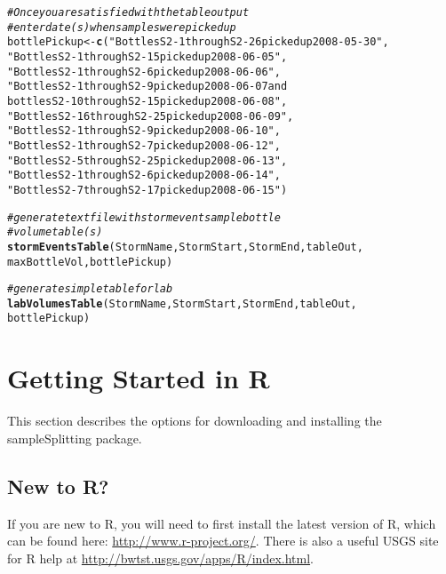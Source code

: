 \documentclass[a4paper,11pt]{article}\usepackage[]{graphicx}\usepackage[]{color}
\makeatletter
\newcommand{\hlstr}[1]{\textcolor[rgb]{0.192,0.494,0.8}{#1}}%
\newcommand{\hlcom}[1]{\textcolor[rgb]{0.678,0.584,0.686}{\textit{#1}}}%
\newcommand{\hlstd}[1]{\textcolor[rgb]{0.345,0.345,0.345}{#1}}%
\newcommand{\hlkwb}[1]{\textcolor[rgb]{0.69,0.353,0.396}{#1}}%
\newcommand{\hlkwd}[1]{\textcolor[rgb]{0.737,0.353,0.396}{\textbf{#1}}}%
\newenvironment{kframe}{%
 \def\at@end@of@kframe{}%
 \ifinner\ifhmode%
  \def\at@end@of@kframe{\end{minipage}}%
  \begin{minipage}{\columnwidth}%
 \fi\fi%
 \def\FrameCommand##1{\hskip\@totalleftmargin \hskip-\fboxsep
 \colorbox{shadecolor}{##1}\hskip-\fboxsep
     \hskip-\linewidth \hskip-\@totalleftmargin \hskip\columnwidth}%
 \MakeFramed {\advance\hsize-\width
   \@totalleftmargin\z@ \linewidth\hsize
   \@setminipage}}%
 {\par\unskip\endMakeFramed%
 \at@end@of@kframe}
\newenvironment{knitrout}{}{} %
\makeatother
\begin{document}
\begin{knitrout}
\color{fgcolor}\begin{kframe}
\begin{alltt}
\hlcom{#Once you are satisfied with the table output}
\hlcom{#enter date(s) when samples were picked up }
\hlstd{bottlePickup} \hlkwb{<-} \hlkwd{c}\hlstd{(}\hlstr{"Bottles S2-1 through S2-26 picked up 2008-05-30"}\hlstd{,}
                  \hlstr{"Bottles S2-1 through S2-15 picked up 2008-06-05"}\hlstd{,}
                  \hlstr{"Bottles S2-1 through S2-6 picked up 2008-06-06"}\hlstd{,}
                  \hlstr{"Bottles S2-1 through S2-9 picked up 2008-06-07 and 
                  bottles S2-10 through S2-15 picked up 2008-06-08"}\hlstd{,}
                  \hlstr{"Bottles S2-16 through S2-25 picked up 2008-06-09"}\hlstd{,}
                  \hlstr{"Bottles S2-1 through S2-9 picked up 2008-06-10"}\hlstd{,}
                  \hlstr{"Bottles S2-1 through S2-7 picked up 2008-06-12"}\hlstd{,}
                  \hlstr{"Bottles S2-5 through S2-25 picked up 2008-06-13"}\hlstd{,}
                  \hlstr{"Bottles S2-1 through S2-6 picked up 2008-06-14"}\hlstd{,}
                  \hlstr{"Bottles S2-7 through S2-17 picked up 2008-06-15"}\hlstd{)}

\hlcom{# generate text file with storm event sample bottle }
\hlcom{# volume table(s)}
\hlkwd{stormEventsTable}\hlstd{(StormName,StormStart,StormEnd,tableOut,}
                 \hlstd{maxBottleVol,bottlePickup)}

\hlcom{# generate simple table for lab}
\hlkwd{labVolumesTable}\hlstd{(StormName,StormStart,StormEnd,tableOut,}
                \hlstd{bottlePickup)}
\end{alltt}
\end{kframe}
\end{knitrout}


\FloatBarrier
\clearpage

\section{Getting Started in R}
\label{sec:started}
This section describes the options for downloading and installing the sampleSplitting package.

\subsection{New to R?}
If you are new to R, you will need to first install the latest version of R, which can be found here: \url{http://www.r-project.org/}. There is also a useful USGS site for R help at \url{http://bwtst.usgs.gov/apps/R/index.html}.
\end{document}
